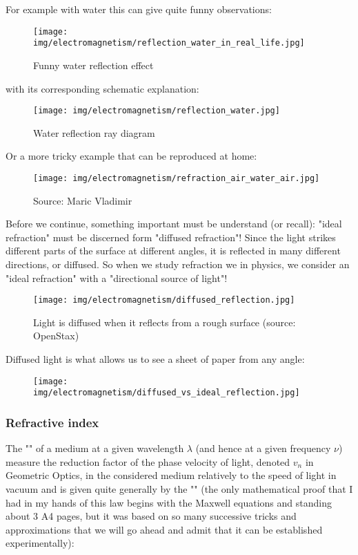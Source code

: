 	For example with water this can give quite funny observations:
	\begin{figure}[H]
		\centering
		\texttt{[image: img/electromagnetism/reflection\_water\_in\_real\_life.jpg]}
		\caption{Funny water reflection effect}
	\end{figure}
	with its corresponding schematic explanation:
	\begin{figure}[H]
		\centering
		\texttt{[image: img/electromagnetism/reflection\_water.jpg]}
		\caption{Water reflection ray diagram}
	\end{figure}
	Or a more tricky example that can be reproduced at home:
	\begin{figure}[H]
		\centering
		\texttt{[image: img/electromagnetism/refraction\_air\_water\_air.jpg]}
		\caption[]{Source: Maric Vladimir}
	\end{figure}
	Before we continue, something important must be understand (or recall): "ideal refraction" must be discerned form "diffused refraction"! Since the light strikes different parts of the surface at different angles, it is reflected in many different directions, or diffused. So when we study refraction we in physics, we consider an "ideal refraction" with a "directional source of light"!
	\begin{figure}[H]
		\centering
		\texttt{[image: img/electromagnetism/diffused\_reflection.jpg]}
		\caption[Light is diffused when it reflects from a rough surface]{Light is diffused when it reflects from a rough surface (source: OpenStax)}
	\end{figure}
	Diffused light is what allows us to see a sheet of paper from any angle:
	\begin{figure}[H]
		\centering
		\texttt{[image: img/electromagnetism/diffused\_vs\_ideal\_reflection.jpg]}
	\end{figure}
	
	\pagebreak
	\subsubsection{Refractive index}
	The "" of a medium at a given wavelength $\lambda$ (and hence at a given frequency $\nu$) measure the reduction factor of the phase velocity of light, denoted $v_n$ in Geometric Optics, in the considered medium relatively to the speed of light in vacuum  and is given quite generally by the "" (the only mathematical proof that I had in my hands of this law begins with the Maxwell equations and standing about $3$ A4 pages, but it was based on so many successive tricks and approximations that we will go ahead and admit that it can be established experimentally):
	
